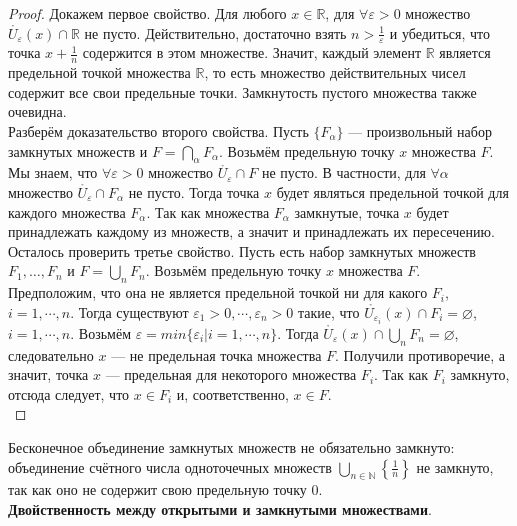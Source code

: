 \documentclass{report}
\begin{document}
\begin{proof}
Докажем первое свойство. Для любого $x \in \mathbb{R}$, для $\forall \varepsilon > 0$ множество $\mathring{U_{\varepsilon}}(x) \cap \mathbb{R}$ не пусто. Действительно, достаточно взять $n> \frac{1}{\varepsilon}$ и убедиться, что точка $x + \frac{1}{n}$ содержится в этом множестве. Значит, каждый элемент $\mathbb{R}$ является предельной точкой множества $\mathbb{R}$, то есть множество действительных чисел содержит все свои предельные точки. Замкнутость пустого множества также очевидна. \\

Разберём доказательство второго свойства. Пусть $\{F_{\alpha}\}$ — произвольный набор замкнутых множеств и $F = \bigcap_{\alpha} F_{\alpha}$. Возьмём предельную точку $x$ множества $F$. Мы знаем, что $\forall \varepsilon > 0$ множество $\mathring{U_{\varepsilon}} \cap F$ не пусто. В частности, для $\forall \alpha$ множество $\mathring{U_{\varepsilon}} \cap F_{\alpha}$ не пусто. Тогда точка $x$ будет являться предельной точкой для каждого множества $F_{\alpha}$. Так как множества $F_{\alpha}$ замкнутые, точка $x$ будет принадлежать каждому из множеств, а значит и принадлежать их пересечению. \\

Осталось проверить третье свойство. Пусть есть набор замкнутых множеств $F_1, \ldots, F_n$ и $F =\bigcup_n F_n$. Возьмём предельную точку $x$ множества $F$. Предположим, что она не является предельной точкой ни для какого $F_i$, $i=1,\cdots,n$. Тогда существуют $\varepsilon_1 >0, \cdots, \varepsilon_n >0$ такие, что $\mathring{U_{\varepsilon_i}}(x) \cap F_i = \varnothing$, $i=1,\cdots,n$. Возьмём $\varepsilon=min\{\varepsilon_i|i=1,\cdots,n\}$. Тогда $\mathring{U_{\varepsilon}}(x) \cap \bigcup_n F_n = \varnothing$, следовательно $x$ — не предельная точка множества $F$. Получили противоречие, а значит, точка $x$ — предельная для некоторого множества $F_i$. Так как $F_i$ замкнуто, отсюда следует, что $x \in F_i$ и, соответственно, $x \in F$.\\

\end{proof}

Бесконечное объединение замкнутых множеств не обязательно замкнуто: объединение счётного числа одноточечных множеств $\bigcup_{n \in \mathbb{N}}\left\{\frac{1}{n} \right\}$ не замкнуто, так как оно не содержит свою предельную точку $0$.\\

\textbf{Двойственность между открытыми и замкнутыми множествами}.\\
\end{document}
